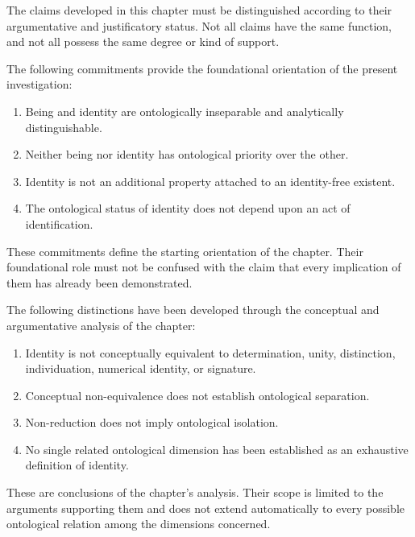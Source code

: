 The claims developed in this chapter must be distinguished
according to their argumentative and justificatory status.
Not all claims have the same function, and not all possess
the same degree or kind of support.

The following commitments provide the foundational
orientation of the present investigation:

\begin{enumerate}
    \item Being and identity are ontologically inseparable
    and analytically distinguishable.

    \item Neither being nor identity has ontological
    priority over the other.

    \item Identity is not an additional property attached
    to an identity-free existent.

    \item The ontological status of identity does not
    depend upon an act of identification.
\end{enumerate}

These commitments define the starting orientation of
the chapter. Their foundational role must not be confused
with the claim that every implication of them has already
been demonstrated.

The following distinctions have been developed through
the conceptual and argumentative analysis of the chapter:

\begin{enumerate}
    \item Identity is not conceptually equivalent to
    determination, unity, distinction, individuation,
    numerical identity, or signature.

    \item Conceptual non-equivalence does not establish
    ontological separation.

    \item Non-reduction does not imply ontological isolation.

    \item No single related ontological dimension has
    been established as an exhaustive definition
    of identity.
\end{enumerate}

These are conclusions of the chapter's analysis. Their
scope is limited to the arguments supporting them and
does not extend automatically to every possible
ontological relation among the dimensions concerned.


